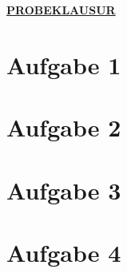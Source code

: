 \newcommand{\examdate}{16.02.2021}
\newcommand{\lecturer}{Andre Wachsmuth}
\newcommand{\modulecode}{3MI-MATHE-10}
\newcommand{\module}{Algebra/Analysis}
\newcommand{\submodule}{Analysis}
\newcommand{\termnumber}{1}
\newcommand{\allottedtime}{60 min}
\newcommand{\permittedtools}{1 handbeschriebenes A4-Blatt}
\newcommand{\scoretable}{
	\begin{tabularx}{\textwidth}{l|Y|Y|Y|Y|Y|Y}
		Aufgabe        & 1 & 2 & 3 & 4  & 5 & Summe \\ [1ex] \hline
		Soll-Punktzahl & 8 & 8 & 8 & 8  & 8 &       \\ [3ex]
		Ist-Punktzahl  &   &   &   &    &   &      ¸\\ [3ex]
	\end{tabularx}
}





\begin{center}
	\color{red} \underline{\textbf{PROBEKLAUSUR}}
\end{center}



\newpage

\section* {Aufgabe 1}



\newpage

\section* {Aufgabe 2}



\newpage

\section* {Aufgabe 3}



\newpage

\section* {Aufgabe 4}



